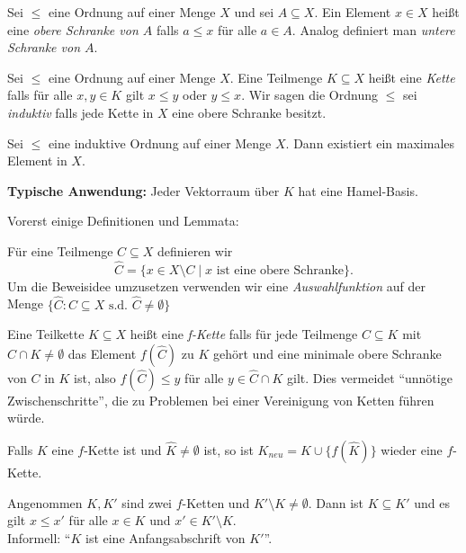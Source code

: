 \begin{definition}
	Sei $\leq$ eine Ordnung auf einer Menge $X$ und sei $A \subseteq X$.
	Ein Element $x \in X$ heißt eine \emph{obere Schranke von $A$} falls $a \leq x$ für alle $a \in A$.
	Analog definiert man \emph{untere Schranke von $A$}.
\end{definition}

\begin{definition}
	Sei $\leq$ eine Ordnung auf einer Menge $X$. Eine Teilmenge $K \subseteq X$ heißt eine \emph{Kette} falls für alle $x,y \in K$ gilt
	$x \leq y$ oder $y \leq x$. Wir sagen die Ordnung $\leq$ sei \emph{induktiv} falls jede Kette in $X$ eine obere Schranke besitzt.
\end{definition}

\begin{theorem}
	Sei $\leq$ eine induktive Ordnung auf einer Menge $X$.
	Dann existiert ein maximales Element in $X$.
\end{theorem}

\textbf{Typische Anwendung:}
Jeder Vektorraum über $K$ hat eine Hamel-Basis.


Vorerst einige Definitionen und Lemmata:
\begin{definition}
	Für eine Teilmenge $C \subseteq X$ definieren wir
	\[
	\widehat{C} = \{x \in X \setminus C \mid x \text{ ist eine obere Schranke}\} 
	.\] 
	Um die Beweisidee umzusetzen verwenden wir eine \emph{Auswahlfunktion} auf der Menge $\{\widehat{C} : C \subseteq X \text{ s.d. } \hat{C} \neq \emptyset\}$
\end{definition}

\begin{definition}
	Eine Teilkette $K \subseteq X$ heißt eine \emph{f-Kette} falls für jede Teilmenge $C \subseteq K$ mit $\widehat{C} \cap K \neq \emptyset$ das Element
	$f(\widehat{C})$ zu $K$ gehört und eine minimale obere Schranke von $C$ in $K$ ist, also $f(\widehat{C}) \leq y$ für alle $y \in \widehat{C} \cap K$ gilt.
	Dies vermeidet \enquote{unnötige Zwischenschritte}, die zu Problemen bei einer Vereinigung von Ketten führen würde.
\end{definition}


\begin{lemma}[Verlängerung]
	Falls $K$ eine $f$-Kette ist und $\widehat{K} \neq \emptyset$ ist, so ist $K_{neu} = K \cup \{f(\widehat{K})\} $ wieder eine $f$-Kette.
\end{lemma}


\begin{lemma}
	Angenommen $K,K'$ sind zwei $f$-Ketten und $K' \setminus K \neq \emptyset$.
	Dann ist $K \subseteq K'$ und es gilt $x \leq x'$ für alle $x \in K$ und $x' \in K' \setminus K$.\\
	Informell: \enquote{$K$ ist eine Anfangsabschrift von $K'$}.
\end{lemma}


